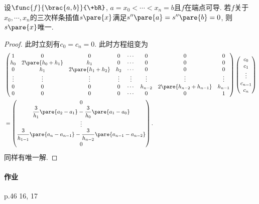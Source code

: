 \documentclass[hidelinks]{ctexart}
\begin{document}
\begin{theorem}
    设$\func{f}{\brac{a,b}}{\+bR}$, $a=x_0<\cdots<x_n = b$且$f$在端点可导. 若$f$关于$x_0, \cdots, x_n$的三次样条插值$s\pare{x}$满足$s''\pare{a} = s''\pare{b} = 0$, 则$s\pare{x}$唯一.
\end{theorem}
\begin{proof}
    此时立刻有$c_0 = c_n = 0$. 此时方程组变为
    \begin{align*}
        & \begin{pmatrix}
            1 & 0 & 0 & 0 & \cdots & 0 & 0 & 0 \\
            h_0 & 2\pare{h_0+h_1} & h_1 & 0 & \cdots & 0 & 0 & 0 \\
            0 & h_1 & 2\pare{h_1+h_2} & h_2 & \cdots & 0 & 0 & 0 \\
            \vdots & \vdots & \vdots & \vdots & \vdots & \vdots & \vdots & \vdots \\
            0 & 0 & 0 & 0 & \cdots & h_{n-2} & 2\pare{h_{n-2} + h_{n-1}} & h_{n-1} \\
            0 & 0 & 0 & 0 & \cdots & 0 & 0 & 1
        \end{pmatrix} \begin{pmatrix}
            c_0 \\ c_1 \\ \vdots \\ c_{n-1} \\ c_n
        \end{pmatrix}\\ &= \begin{pmatrix}
            \displaystyle 0 \\
            \displaystyle \frac{3}{h_1}\pare{a_2 - a_1} - \frac{3}{h_0}\pare{a_1 - a_0}\\
            \vdots \\
            \displaystyle \frac{3}{h_{1-1}}\pare{a_n - a_{n-1}} - \frac{3}{h_{n-2}}\pare{a_{n-1} - a_{n-2}}\\
            \displaystyle 0
        \end{pmatrix}.
    \end{align*}
    同样有唯一解.
\end{proof}

\paragraph{作业} %
\label{par:作业}

p.46 16, 17



\end{document}
